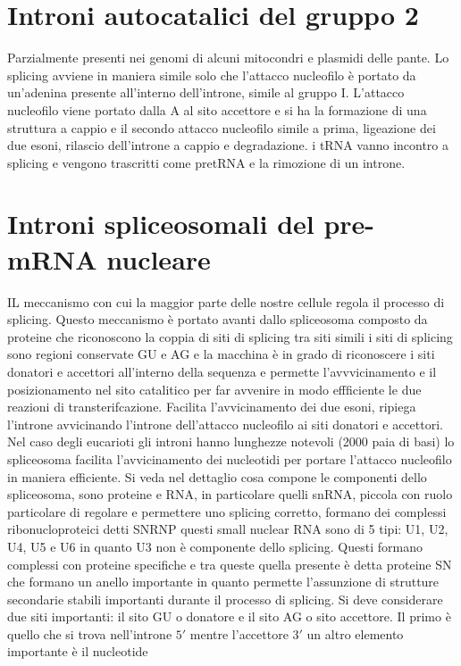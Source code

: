 \section{Introni autocatalici del gruppo 2}
Parzialmente presenti nei genomi di alcuni mitocondri e plasmidi delle pante. Lo splicing avviene in maniera simile solo che l'attacco nucleofilo \`e portato da un'adenina presente 
all'interno dell'introne, simile al gruppo I. L'attacco nucleofilo viene portato dalla A al sito accettore e si ha la formazione di una struttura a cappio e il secondo attacco nucleofilo
simile a prima, ligeazione dei due esoni, rilascio dell'introne a cappio e degradazione. i tRNA vanno incontro a splicing e vengono trascritti come pretRNA e la rimozione di un introne.
\section{Introni spliceosomali del pre-mRNA nucleare}
IL meccanismo con cui la maggior parte delle nostre cellule regola il processo di splicing. Questo meccanismo \`e portato avanti dallo spliceosoma composto da proteine che riconoscono
la coppia di siti di splicing tra siti simili i siti di splicing sono regioni conservate GU e AG e la macchina \`e in grado di riconoscere i siti donatori e accettori all'interno della
sequenza e permette l'avvvicinamento e il posizionamento nel sito catalitico per far avvenire in modo effficiente le due reazioni di transterifcazione. Facilita l'avvicinamento dei 
due esoni, ripiega l'introne avvicinando l'introne dell'attacco nucleofilo ai siti donatori e accettori. Nel caso degli eucarioti gli introni hanno lunghezze notevoli (2000 paia di basi)
lo spliceosoma facilita l'avvicinamento dei nucleotidi per portare l'attacco nucleofilo in maniera efficiente. Si veda nel dettaglio cosa compone le componenti dello spliceosoma, sono 
proteine e RNA, in particolare quelli snRNA, piccola con ruolo particolare di regolare e permettere uno splicing corretto, formano dei complessi ribonucloproteici detti SNRNP questi small
nuclear RNA sono di 5 tipi: U1, U2, U4, U5 e U6 in quanto U3 non \`e componente dello splicing. Questi formano complessi con proteine specifiche e tra queste quella presente \`e detta
proteine SN che formano un anello importante in quanto permette l'assunzione di strutture secondarie stabili importanti durante il processo di splicing. Si deve considerare due siti
importanti: il sito GU o donatore e il sito AG o sito accettore. Il primo \`e quello che si trova nell'introne $5'$ mentre l'accettore $3'$ un altro elemento importante \`e il nucleotide
